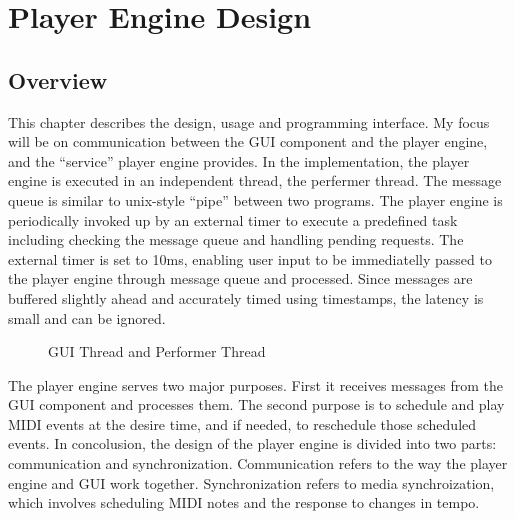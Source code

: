 
\chapter{Player Engine Design} %

\section{Overview}
This chapter describes the design, usage and programming interface. My focus 
will be on communication between the GUI component and the player engine, and 
the ``service'' player engine provides. In the implementation, the player 
engine is executed in an independent thread, the perfermer thread. The 
message queue is similar to unix-style ``pipe'' between two programs. The 
player engine is periodically invoked up by an external timer to 
execute a predefined task including checking the message queue and handling 
pending requests. The external timer is set to 10ms, enabling user 
input to be immediatelly passed to the player engine through message queue and 
processed. Since messages are buffered slightly ahead and accurately timed 
using timestamps, the latency is small and can be ignored.

\begin{figure}[H]
\caption{GUI Thread and Performer Thread}
\label{fig:speciation}
\end{figure}

The player engine serves two major purposes. First it receives
messages from the GUI component and processes them. The second purpose is to 
schedule and play MIDI events at the desire time, and if needed, to
reschedule those scheduled events. In concolusion, the design of the player 
engine is divided into two parts: communication and synchronization. 
Communication refers to the way the player engine and GUI work together. 
Synchronization refers to media synchroization, which involves scheduling 
MIDI notes and the response to changes in tempo. 

